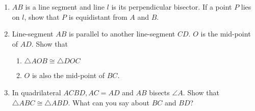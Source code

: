 \begin{enumerate}[label=\arabic*.,ref=\thesubsection.\theenumi]
%
\item $AB$ is a line segment and line $l$ is its perpendicular bisector. If a point $P$ lies on $l$, show that $P$ is equidistant from $A$ and $B$.
\item Line-segment $AB$ is parallel to another line-segment $CD$. $O$ is the mid-point of $AD$. Show that 
\begin{enumerate}
\item  $\triangle AOB \cong \triangle DOC$ 
\item  $O$ is also the mid-point of $BC$.
\end{enumerate}
%
\item In quadrilateral $ACBD, AC = AD$ and $AB$ bisects $\angle  A$. Show that $\triangle  ABC \cong \triangle  ABD$. What can you say about $BC$ and $BD$?
\label{prob:8.1.23}
\begin{enumerate}


\end{enumerate}


\end{enumerate}
